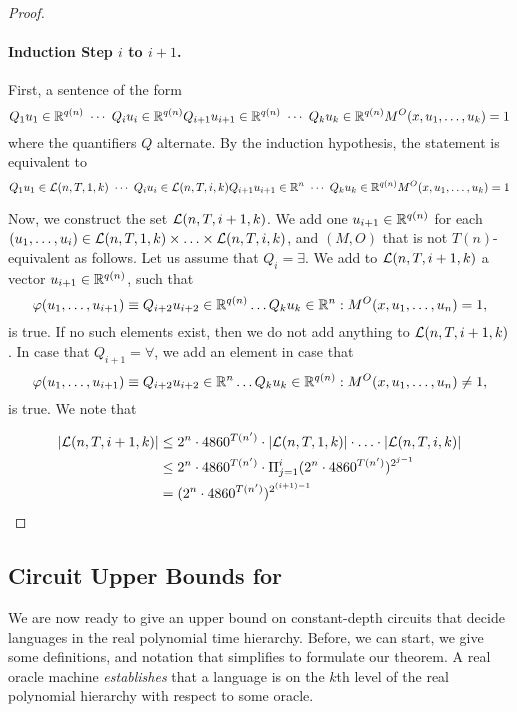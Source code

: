 \documentclass{article}
\begin{document}
\begin{proof}
    \paragraph{Induction Step $i$ to $i+1$.}  
    First, a sentence of the form
    \[Q_1 u_1 \in \R^{q(n)} 
    \ \cdots \ 
    Q_i u_i \in \R^{q(n)}
    Q_{i+1} u_{i+1} \in \R^{q(n)}
    \ \cdots \ 
    Q_k u_k \in  \R^{q(n)} M^O(x, u_1,\ldots,u_k) =1\]
    where the quantifiers $Q$ alternate.
    By the induction hypothesis, the statement is equivalent to
    \[Q_1 u_1 \in \LLL(n,T,1,k)
    \ \cdots \ 
    Q_i u_i \in \LLL(n,T,i,k)
    Q_{i+1} u_{i+1} \in \R^n
    \ \cdots \ 
    Q_k u_k \in  \R^{q(n)} M^O(x, u_1,\ldots,u_k) =1\]
    
    Now, we construct the set $\mathcal{L}(n,T,i+1,k)$.
    We add one $u_{i+1} \in \mathbb{R}^{q(n)}$ for each $(u_1,\ldots,u_i)\in \mathcal{L}(n,T,1,k)\times \ldots \times \mathcal{L}(n,T,i,k)$,
    and $(M,O)$ that is not $T(n)$-equivalent as follows.
    Let us assume that $Q_i = \exists$.
    We add to  $\mathcal{L}(n,T,i+1,k)$ a vector $u_{i+1}\in \mathbb{R}^{q(n)}$,
    such that \[\varphi(u_1,\ldots,u_{i+1}) \equiv Q_{i+2} u_{i+2} \in \mathbb{R}^{q(n)}  \ldots  Q_k u_k \in \mathbb{R}^n :M^O(x,u_1,\ldots,u_n) = 1,\]
    is true.
    If no such elements exist, then we do not add anything to $\mathcal{L}(n,T,i+1,k)$.
    In case that $Q_{i+1} = \forall$, we add an element in case that 
    \[\varphi(u_1,\ldots,u_{i+1}) \equiv Q_{i+2} u_{i+2} \in \mathbb{R}^n  \ldots  Q_k u_k \in \mathbb{R}^{q(n)} :M^O(x, u_1,\ldots,u_n) \neq 1,\]
    is true.
    We note that 

    \begin{align*}
    |\mathcal{L}(n,T,i+1,k)| 
    & \leq 2^n\cdot 4860^{T(n')} \cdot |\mathcal{L}(n,T,1,k)|\cdot \ldots \cdot |\mathcal{L}(n,T,i,k)| \\
    & \leq 2^n\cdot 4860^{T(n')} \cdot \Pi_{j=1}^i (2^n\cdot4860^{T(n')})^{2^{j-1}}\\
    & =(2^n \cdot 4860^{T(n')})^{2^{(i+1)-1}}
    \end{align*}
    
\end{proof}

\subsection{Circuit Upper Bounds for \RPH}
\label{sub:CircuitUpperBounds}

We are now ready to give an upper bound on constant-depth circuits that decide languages in the real polynomial time hierarchy.
Before, we can start, we give some definitions, and notation that simplifies to formulate our theorem.
A real oracle machine \textit{establishes} that a language is on the $k$th level of the real polynomial hierarchy with respect to some oracle.
\begin{comment}
\till{We switch here from using $T$ to using $P$. I understand that the idea is that we start thinking of the running time as some polynomial. 
But why not still use the same letter $T$ to refer to the running time?} 
\end{comment}
\end{document}
